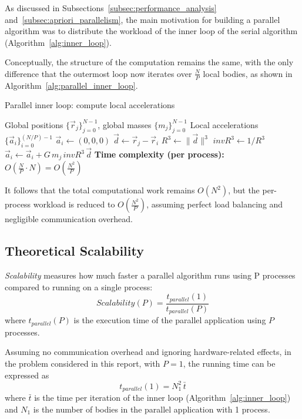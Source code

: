 \documentclass{article}
\begin{document}
As discussed in Subsections~\ref{subsec:performance_analysis} and~\ref{subsec:apriori_parallelism}, 
the main motivation for building a parallel algorithm was to distribute the workload of the inner loop 
of the serial algorithm (Algorithm~\ref{alg:inner_loop}).

Conceptually, the structure of the computation remains the same, with the only difference that 
the outermost loop now iterates over $\frac{N}{P}$ local bodies, as shown in 
Algorithm~\ref{alg:parallel_inner_loop}.


\begin{algorithm}[H]
\caption{Parallel inner loop: compute local accelerations}
\label{alg:parallel_inner_loop}
\begin{algorithmic}[1]
\Require Global positions $\{\vec r_j\}_{j=0}^{N-1}$, global masses $\{m_j\}_{j=0}^{N-1}$
\Ensure Local accelerations $\{\vec a_i\}_{i=0}^{(N/P)-1}$
  \State $\vec a_i \gets (0,0,0)$
      \State $\vec d \gets \vec r_j - \vec r_i$
      \State $R^3 \gets \|\vec d\|^3$
      \State $invR^3 \gets 1 / R^3$
      \State $\vec a_i \gets \vec a_i + G \, m_j \, invR^3 \, \vec d$
    \EndIf
  \EndFor
\EndFor
\Statex \textbf{Time complexity (per process):} $O\!\left(\frac{N}{P} \cdot N\right) = O\!\left(\frac{N^2}{P}\right)$
\end{algorithmic}
\end{algorithm}

It follows that the total computational work remains $O(N^2)$, but the per-process 
workload is reduced to $O\!\left(\frac{N^2}{P}\right)$, assuming perfect load balancing 
and negligible communication overhead.

\subsection{Theoretical Scalability}
\emph{Scalability} measures how much faster a parallel algorithm runs using P processes compared to running on a single process:
\begin{equation}
Scalability(P) = \frac{t_{parallel}(1)}{t_{parallel}(P)}
\end{equation}
where $t_{parallel}(P)$ is the execution time of the parallel application using $P$ processes.


Assuming no communication overhead and ignoring hardware-related effects, in the problem considered in this report, with $P = 1$, the running time can be expressed as
\begin{equation}
t_{{parallel}}(1) = N_1^2 \, \bar{t}
\end{equation}
where $\bar{t}$ is the time per iteration of the inner loop (Algorithm~\ref{alg:inner_loop}) and $N_1$ is the number of bodies in the parallel application with 1 process.
\end{document}
